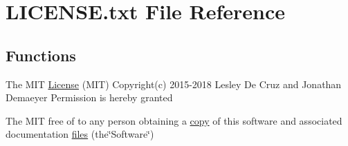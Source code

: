 \hypertarget{LICENSE_8txt}{}\section{L\+I\+C\+E\+N\+S\+E.\+txt File Reference}
\label{LICENSE_8txt}
\subsection*{Functions}
\begin{DoxyCompactItemize}
\item 
The M\+IT \hyperlink{LICENSE_8txt_a31c52f1233dd0e949e7178e7c178dcf7}{License} (M\+IT) Copyright(c) 2015-\/2018 Lesley De Cruz and Jonathan Demaeyer Permission is hereby granted
\item 
The M\+IT free of to any person obtaining a \hyperlink{LICENSE_8txt_aff1d4c6b756ebf691fa44a0904f68658}{copy} of this software and associated documentation \hyperlink{LICENSE_8txt_abdb4f4971cf029244bb81834ee9b393d}{files} (the\char`\"{}Software\char`\"{})
\end{DoxyCompactItemize}
